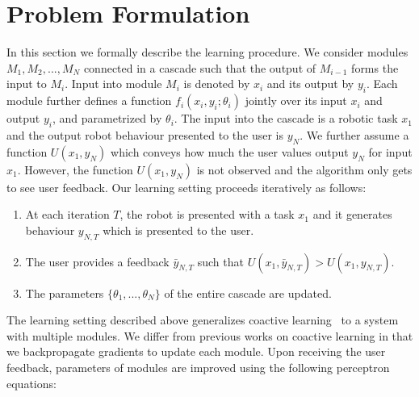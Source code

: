 \section{Problem Formulation}
In this section we formally describe the learning procedure. We consider modules $M_1,M_2,...,M_N$ connected in a cascade such that the output of $M_{i-1}$ forms the input to $M_i$. Input into  module $M_i$ is denoted by $x_i$ and its output by $y_i$. Each module further defines a function $f_i(x_i,y_i;\theta_i)$ jointly over its input $x_i$ and output $y_i$, and parametrized by $\theta_i$. The input into the cascade is a robotic task $x_1$ and the output robot behaviour presented to the user is $y_N$. 
We further assume a function $U(x_1,y_N)$ which conveys how much the user values output $y_N$ for input $x_1$. However, the function $U(x_1,y_N)$ is not observed and the algorithm only gets to see user feedback. Our learning setting proceeds iteratively as follows:
\begin{enumerate}
\item At each iteration $T$, the robot is presented with a task $x_1$ and it generates behaviour $y_{N,T}$ which is presented to the user.
\item The user provides a feedback $\bar{y}_{N,T}$ such that $U(x_1,\bar{y}_{N,T}) > U(x_1,{y}_{N,T})$.
\item The parameters $\{\theta_1,...,\theta_N\}$ of the entire cascade are updated.
\end{enumerate} 

The learning setting described above generalizes coactive learning~\citep{Jain13,Shivaswamy12} to a system with multiple modules. We differ from previous works on coactive learning in that we backpropagate gradients to update each module. Upon receiving the user feedback, parameters of modules are improved using the following perceptron equations:   